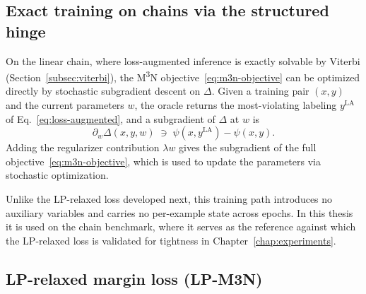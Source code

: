 \subsection{Exact training on chains via the structured hinge}
\label{subsec:structured-hinge}

On the linear chain, where loss-augmented inference is exactly
solvable by Viterbi (Section~\ref{subsec:viterbi}), the
M\textsuperscript{3}N objective~\eqref{eq:m3n-objective} can be
optimized directly by stochastic subgradient descent on $\Delta$.
Given a training pair $(x, y)$ and the current parameters $w$,
the oracle returns the most-violating labeling $y^{\mathrm{LA}}$
of Eq.~\eqref{eq:loss-augmented}, and a subgradient of $\Delta$
at $w$ is
\begin{equation}
    \partial_w \Delta(x, y, w)
    \;\ni\; \psi(x, y^{\mathrm{LA}}) - \psi(x, y).
    \label{eq:hinge-subgradient}
\end{equation}
Adding the regularizer contribution $\lambda w$ gives the
subgradient of the full objective~\eqref{eq:m3n-objective}, which
is used to update the parameters via stochastic optimization.

Unlike the LP-relaxed loss developed next, this training path
introduces no auxiliary variables and carries no per-example
state across epochs. In this thesis it is used on the chain
benchmark, where it serves as the reference against which the
LP-relaxed loss is validated for tightness in
Chapter~\ref{chap:experiments}.

\subsection{LP-relaxed margin loss (LP-M3N)}
\label{subsec:lp-m3n}

